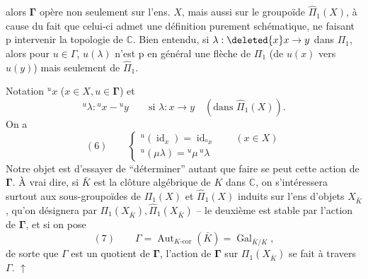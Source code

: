 alors $\mathbf{\Gamma}$ opère non seulement sur  l'ens. $X$, mais aussi sur le groupoïde $\widehat\Pi_1(X)$, à cause du fait que celui-ci admet une définition purement schématique, ne faisant p intervenir la topologie de $\mathbb C$. Bien entendu, si $\lambda:\deleted{x} x\to y$ dans $\Pi_1$, alors pour $u\in\Gamma$, $u(\lambda)$ n'est p en général une flèche de $\Pi_1$ (de $u(x)$ vers $u(y)$) mais seulement de $\widehat\Pi_1$.

 Notation ${}^ux$ ($x\in X,u\in\mathbf{\Gamma}$) et 
\[
{}^u\lambda:{}^ux-{}^uy\qquad\text{si }\lambda:x\to y\quad(\text{dans }\widehat\Pi_1(X)).
\]
On a
\[
(6)\qquad\begin{cases}
{}^u(\operatorname{id}_x)=\operatorname{id}_{{}^ux}\qquad(x\in X)\\
{}^u(\mu\lambda)={}^u\mu\,{}^u\lambda
\end{cases}
\]
Notre objet est d'essayer de ``déterminer'' autant que faire se peut cette action de $\mathbf{\Gamma}$. À vrai dire, si $\bar K$ est la clôture algébrique de $K$ dans $\mathbb C$, on s'intéressera surtout aux sous-groupoïdes de $\Pi_1(X)$ et $\widehat\Pi_1(X)$ induits sur l'ens d'objets $X_{\bar K}$, qu'on désignera par $\Pi_1(X_{\bar K}),\widehat\Pi_1(X_{\bar K})$ -- le deuxième est stable par l'action de $\mathbf{\Gamma}$, et si on pose
\[
(7)\qquad\Gamma=\operatorname{Aut}_{K\text{-cor}}(\bar K)=\operatorname{Gal}_{\bar K/K},
\]
de sorte que $\Gamma$ est un quotient de $\mathbf{\Gamma}$, l'action de $\mathbf{\Gamma}$ sur $\Pi_1(X_{\bar K})$ se fait à travers $\Gamma$. $\uparrow$

